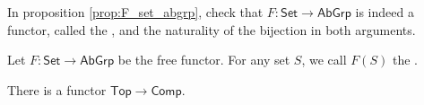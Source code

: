 \begin{exercise}
	In proposition \ref{prop:F_set_abgrp}, check that $F : \mathsf{Set} \to \mathsf{AbGrp}$ is indeed a functor, called the , and the naturality of the bijection in both arguments. 
\end{exercise}

\begin{definition}
	Let $F : \mathsf{Set} \to \mathsf{AbGrp}$ be the free functor. For any set $S$, we call $F(S)$ the .
\end{definition}


\begin{theorem}
	There is a functor $\mathsf{Top} \to \mathsf{Comp}$.
	\label{thm:singular_complex}
\end{theorem}

